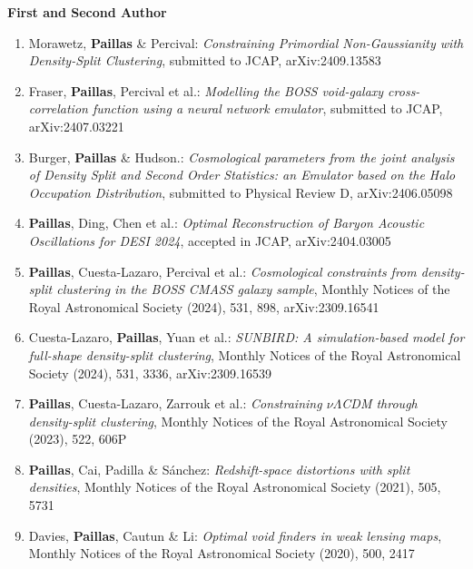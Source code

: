 \documentclass[12pt, a4paper]{article} %
\begin{document}
\textbf{First and Second Author}
\begin{flushleft}%
  \setlength{\leftskip}{0.2cm}%
\begin{enumerate}
\setlength\itemsep{0.05cm}

\item[12.] Morawetz, \textbf{Paillas} \& Percival: \textit{Constraining Primordial Non-Gaussianity with Density-Split Clustering}, submitted to JCAP, arXiv:2409.13583

\item[11.] Fraser, \textbf{Paillas}, Percival et al.: \textit{Modelling the BOSS void-galaxy cross-correlation function using a neural network emulator}, submitted to JCAP, arXiv:2407.03221

\item[10.] Burger, \textbf{Paillas} \& Hudson.: \textit{Cosmological parameters from the joint analysis of Density Split and Second Order Statistics: an Emulator based on the Halo Occupation Distribution}, submitted to Physical Review D, arXiv:2406.05098

\item[9.] \textbf{Paillas}, Ding, Chen et al.: \textit{Optimal Reconstruction of Baryon Acoustic Oscillations for DESI 2024}, accepted in JCAP, arXiv:2404.03005

\item[8.] \textbf{Paillas}, Cuesta-Lazaro, Percival et al.: \textit{Cosmological constraints from density-split clustering in the BOSS CMASS galaxy sample}, Monthly Notices of the Royal Astronomical Society (2024), 531, 898, arXiv:2309.16541

\item[7.] Cuesta-Lazaro, \textbf{Paillas}, Yuan et al.: \textit{SUNBIRD: A simulation-based model for full-shape density-split clustering}, Monthly Notices of the Royal Astronomical Society (2024), 531, 3336, arXiv:2309.16539

\item[6.] \textbf{Paillas}, Cuesta-Lazaro, Zarrouk et al.: \textit{Constraining $\nu\Lambda$CDM through density-split clustering}, Monthly Notices of the Royal Astronomical Society (2023), 522, 606P

\item[5.] \textbf{Paillas}, Cai, Padilla \& S\'anchez: \textit{Redshift-space distortions with split densities}, Monthly Notices of the Royal Astronomical Society (2021), 505, 5731

\item[4.] Davies, \textbf{Paillas}, Cautun \& Li: \textit{Optimal void finders in weak lensing maps}, Monthly Notices of the Royal Astronomical Society (2020), 500, 2417


\end{enumerate}
\end{flushleft}
\end{document}
